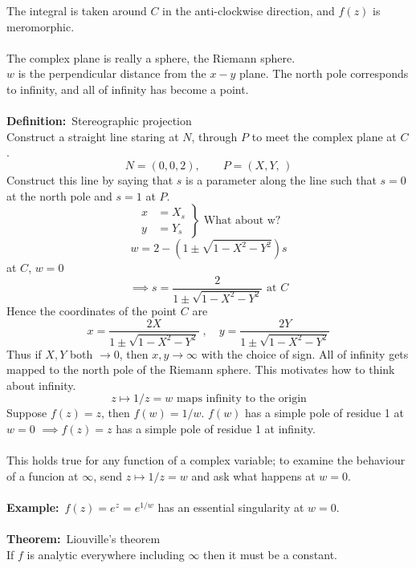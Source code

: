 \documentclass{article}
\newcommand{\definition}{\textbf{Definition:}}
\newcommand{\example}{\textbf{Example:}}
\newcommand{\theorem}{\textbf{Theorem:}}
\begin{document}
The integral is taken around $C$ in the anti-clockwise direction, and
$f(z)$ is meromorphic.
\\
\\
The complex plane is really a sphere, the Riemann sphere.
\\
$w$ is the perpendicular distance from the $x-y$ plane.
The north pole corresponds to infinity, and all of infinity 
has become a point.
\\
\\
\definition\ Stereographic projection
\\
Construct a straight line staring at $N$, through $P$ to meet the
complex plane at $C$.
\[ N = (0,0,2), \qquad P = (X,Y,\,) \]
Construct this line by saying that $s$ is a parameter along the line 
such that $s=0$ at the north pole and $s=1$ at $P$.
\[ \left. \begin{array}{cc}
x &= X_s \\
y &= Y_s \end{array} \right\} \mbox{ What about w?} \]
\[ w = 2 - (1 \pm \sqrt{1-X^2-Y^2})s \]
at $C$, $w=0$
\[ \implies s = \frac{2}{1 \pm \sqrt{1 - X^2 -Y^2}} \mbox{ at } C \]
Hence the coordinates of the point $C$ are
\[ x= \frac{2X}{1 \pm \sqrt{1 - X^2 -Y^2}} \;, \quad
 y= \frac{2Y}{1 \pm \sqrt{1 - X^2 -Y^2}} \]
Thus if $X,Y$ both $\to 0$, then $x,y \to \infty$ with the choice of sign.
All of infinity gets mapped to the north pole of the Riemann sphere. This
motivates how to think about infinity.
\[ z \mapsto 1/z = w \mbox{ maps infinity to the origin} \]
Suppose $f(z)=z$, then $f(w) = 1/w$.
$f(w)$ has a simple pole of residue 1 at $w = 0$
$\implies f(z) = z$ has a simple pole of residue 1 at infinity.
\\
\\
This holds true for any function of a complex variable; to 
examine the behaviour of a funcion at $\infty$, send 
$z \mapsto 1/z = w$ and ask what happens at $w=0$.
\\
\\
\example\ $f(z) = e^z= e^{1/w}$ has an essential singularity at $w=0$.
\\
\\
\theorem\ Liouville's theorem
\\
If $f$ is analytic everywhere including $\infty$ then it must be a constant.
\\
\\
\end{document}
